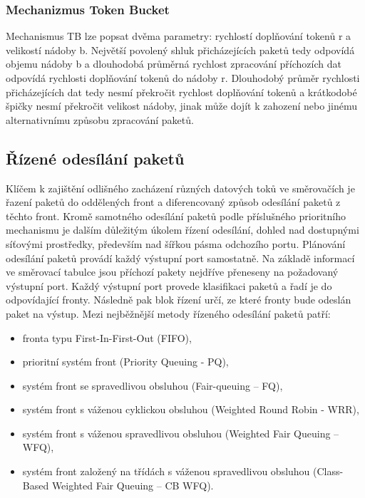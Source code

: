 \subsubsection{Mechanizmus Token Bucket}
Mechanismus TB lze popsat dvěma parametry: rychlostí doplňování tokenů r a velikostí
nádoby b. Největší povolený shluk přicházejících paketů tedy odpovídá objemu nádoby b a
dlouhodobá průměrná rychlost zpracování příchozích dat odpovídá rychlosti doplňování
tokenů do nádoby r. Dlouhodobý průměr rychlosti přicházejících dat tedy nesmí překročit
rychlost doplňování tokenů a krátkodobé špičky nesmí překročit velikost nádoby, jinak může
dojít k zahození nebo jinému alternativnímu způsobu zpracování paketů.


\subsection{Řízené odesílání paketů}
Klíčem k zajištění odlišného zacházení různých datových toků ve směrovačích je řazení
paketů do oddělených front a diferencovaný způsob odesílání paketů z těchto front. Kromě
samotného odesílání paketů podle příslušného prioritního mechanismu je dalším důležitým
úkolem řízení odesílání, dohled nad dostupnými síťovými prostředky, především nad šířkou
pásma odchozího portu. Plánování odesílání paketů provádí každý výstupní port samostatně. Na
základě informací ve směrovací tabulce jsou příchozí pakety nejdříve přeneseny na
požadovaný výstupní port. Každý výstupní port provede klasifikaci paketů a řadí je do
odpovídající fronty. Následně pak blok řízení určí, ze které fronty bude odeslán paket na
výstup.
Mezi nejběžnější metody řízeného odesílání paketů patří:
\begin{itemize}
\item fronta typu First-In-First-Out (FIFO),
\item prioritní systém front (Priority Queuing - PQ),
\item systém front se spravedlivou obsluhou (Fair-queuing – FQ),
\item systém front s váženou cyklickou obsluhou (Weighted Round Robin - WRR),
\item systém front s váženou spravedlivou obsluhou (Weighted Fair Queuing – WFQ),
\item systém front založený na třídách s váženou spravedlivou obsluhou (Class-Based Weighted Fair Queuing – CB WFQ).
\end{itemize}
\newpage







